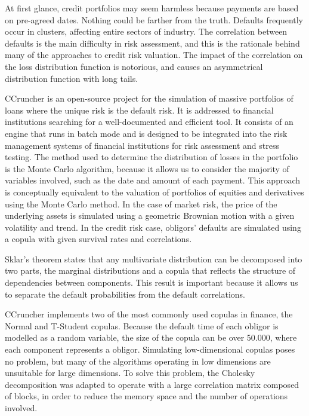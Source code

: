 \documentclass[a4paper,12pt,final]{article}
\begin{document}
At first glance, credit portfolios may seem harmless because payments are based on 
pre-agreed dates. Nothing could be farther from the truth. Defaults frequently occur 
in clusters, affecting entire sectors of industry. The correlation between defaults 
is the main difficulty in risk assessment, and this is the rationale behind many of 
the approaches to credit risk valuation. The impact of the correlation on the loss 
distribution function is notorious, and causes an asymmetrical distribution function 
with long tails.
\newline

CCruncher is an open-source project for the simulation of massive portfolios of 
loans where the unique risk is the default risk. It is addressed to financial institutions 
searching for a well-documented and efficient tool. It consists of an engine that runs 
in batch mode and is designed to be integrated into the risk management systems of 
financial institutions for risk assessment and stress testing. The method used to 
determine the distribution of losses in the portfolio is the Monte Carlo algorithm, 
because it allows us to consider the majority of variables involved, such as the 
date and amount of each payment. This approach is conceptually equivalent to the 
valuation of portfolios of equities and derivatives using the Monte Carlo method. 
In the case of market risk, the price of the underlying assets is simulated using 
a geometric Brownian motion with a given volatility and trend. In the credit risk 
case, obligors' defaults are simulated using a copula with given survival rates 
and correlations.
\newline

Sklar's theorem states that any multivariate distribution can be decomposed into 
two parts, the marginal distributions and a copula that reflects the structure of 
dependencies between components. This result is important because it allows us to 
separate the default probabilities from the default correlations.
\newline

CCruncher implements two of the most commonly used copulas in finance, the Normal 
and T-Student copulas. Because the default time of each obligor is modelled as a 
random variable, the size of the copula can be over 50.000, where each component 
represents a obligor. Simulating low-dimensional copulas poses no problem, but many 
of the algorithms operating in low dimensions are unsuitable for large dimensions. 
To solve this problem, the Cholesky decomposition was adapted to operate with a large 
correlation matrix composed of blocks, in order to reduce the memory space and the 
number of operations involved.
\end{document}
